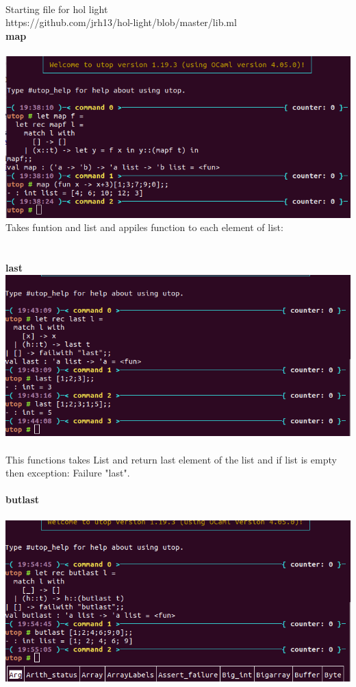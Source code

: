 \documentclass{article}
\begin{document}
\\
Starting file for hol light\\
https://github.com/jrh13/hol-light/blob/master/lib.ml\\
\textbf{map}\\
\\
\includegraphics{images/image4.png}
\\
Takes funtion and list and appiles function to each element of list:\\
\\
\\
\textbf{last}\\
\includegraphics{images/image10.png}
\\
\\
This functions takes List and return last element of the list
and if list is empty then exception: Failure "last".\\
\\
\textbf{butlast}\\
\\
\includegraphics{images/image9.png}
\end{document}
